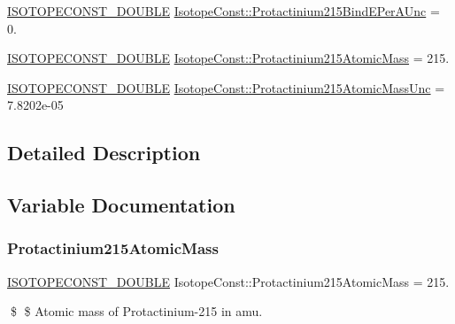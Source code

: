 \begin{DoxyCompactItemize}
\item 
\mbox{\hyperlink{group___isotope_const-_macros_ga8f45a7272ce02c0b4c65c44636ed719a}{I\+S\+O\+T\+O\+P\+E\+C\+O\+N\+S\+T\+\_\+\+D\+O\+U\+B\+LE}} \mbox{\hyperlink{group___isotope_const-_protactinium-_pa215_ga4cdfee29082826488ecf206cb54d7c6e}{Isotope\+Const\+::\+Protactinium215\+Bind\+E\+Per\+A\+Unc}} = 0.
\item 
\mbox{\hyperlink{group___isotope_const-_macros_ga8f45a7272ce02c0b4c65c44636ed719a}{I\+S\+O\+T\+O\+P\+E\+C\+O\+N\+S\+T\+\_\+\+D\+O\+U\+B\+LE}} \mbox{\hyperlink{group___isotope_const-_protactinium-_pa215_ga4c4df251b9e10724c91dfbb9bdae7667}{Isotope\+Const\+::\+Protactinium215\+Atomic\+Mass}} = 215.
\item 
\mbox{\hyperlink{group___isotope_const-_macros_ga8f45a7272ce02c0b4c65c44636ed719a}{I\+S\+O\+T\+O\+P\+E\+C\+O\+N\+S\+T\+\_\+\+D\+O\+U\+B\+LE}} \mbox{\hyperlink{group___isotope_const-_protactinium-_pa215_ga1cfb60878e7e9a92a110909a322d6e5c}{Isotope\+Const\+::\+Protactinium215\+Atomic\+Mass\+Unc}} = 7.\+8202e-\/05
\end{DoxyCompactItemize}


\subsection{Detailed Description}


\subsection{Variable Documentation}
\mbox{\label{group___isotope_const-_protactinium-_pa215_ga4c4df251b9e10724c91dfbb9bdae7667}} 
\subsubsection{\texorpdfstring{Protactinium215\+Atomic\+Mass}{Protactinium215AtomicMass}}
{\footnotesize\ttfamily \mbox{\hyperlink{group___isotope_const-_macros_ga8f45a7272ce02c0b4c65c44636ed719a}{I\+S\+O\+T\+O\+P\+E\+C\+O\+N\+S\+T\+\_\+\+D\+O\+U\+B\+LE}} Isotope\+Const\+::\+Protactinium215\+Atomic\+Mass = 215.}

\$ \$ Atomic mass of Protactinium-\/215 in amu. \mbox{\label{group___isotope_const-_protactinium-_pa215_ga1cfb60878e7e9a92a110909a322d6e5c}} 
